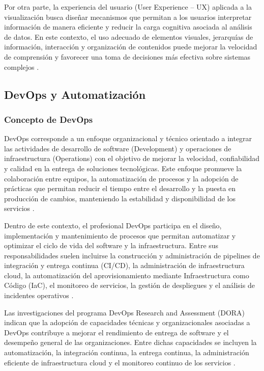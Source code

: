 Por otra parte, la experiencia del usuario (User Experience -- UX) aplicada a la visualización busca diseñar mecanismos que permitan a los usuarios interpretar información de manera eficiente y reducir la carga cognitiva asociada al análisis de datos. En este contexto, el uso adecuado de elementos visuales, jerarquías de información, interacción y organización de contenidos puede mejorar la velocidad de comprensión y favorecer una toma de decisiones más efectiva sobre sistemas complejos \parencite{Shneiderman1996}.

\subsection{DevOps y Automatización}

\subsubsection{Concepto de DevOps}

DevOps corresponde a un enfoque organizacional y técnico orientado a integrar las actividades de desarrollo de software (Development) y operaciones de infraestructura (Operations) con el objetivo de mejorar la velocidad, confiabilidad y calidad en la entrega de soluciones tecnológicas. Este enfoque promueve la colaboración entre equipos, la automatización de procesos y la adopción de prácticas que permitan reducir el tiempo entre el desarrollo y la puesta en producción de cambios, manteniendo la estabilidad y disponibilidad de los servicios \parencite{GoogleCloud2026}.

Dentro de este contexto, el profesional DevOps participa en el diseño, implementación y mantenimiento de procesos que permitan automatizar y optimizar el ciclo de vida del software y la infraestructura. Entre sus responsabilidades suelen incluirse la construcción y administración de pipelines de integración y entrega continua (CI/CD), la administración de infraestructura cloud, la automatización del aprovisionamiento mediante Infraestructura como Código (IaC), el monitoreo de servicios, la gestión de despliegues y el análisis de incidentes operativos \parencite{GoogleCloud2026}.

Las investigaciones del programa DevOps Research and Assessment (DORA) indican que la adopción de capacidades técnicas y organizacionales asociadas a DevOps contribuye a mejorar el rendimiento de entrega de software y el desempeño general de las organizaciones. Entre dichas capacidades se incluyen la automatización, la integración continua, la entrega continua, la administración eficiente de infraestructura cloud y el monitoreo continuo de los servicios \parencite{GoogleCloud2026}.

